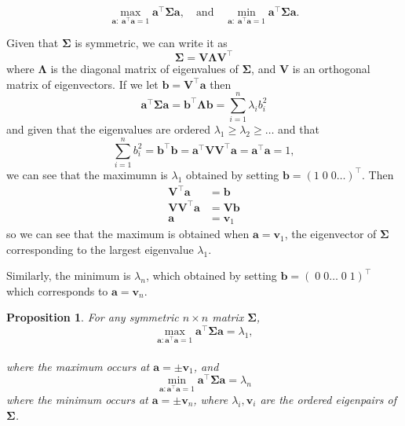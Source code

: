 \documentclass[]{book}
\newtheorem{proposition}{Proposition}[chapter]
\theoremstyle{definition}
\theoremstyle{definition}
\theoremstyle{definition}
\theoremstyle{remark}
\begin{document}
\begin{equation}
\max_{\boldsymbol a: \;\boldsymbol a^\top \boldsymbol a=1}{\mathbf a}^\top {\mathbf \Sigma} {\mathbf a}, \quad \mbox{and}\quad
\min_{\boldsymbol a: \;\boldsymbol a^\top \boldsymbol a=1}{\mathbf a}^\top {\mathbf \Sigma} {\mathbf a}.
\label{eq:eigenopt}
\end{equation}

Given that \(\boldsymbol \Sigma\) is symmetric, we can write it as
\[\boldsymbol \Sigma= \boldsymbol V\boldsymbol \Lambda\boldsymbol V^\top \]
where \(\boldsymbol \Lambda\) is the diagonal matrix of eigenvalues of \(\boldsymbol \Sigma\), and \(\boldsymbol V\) is an orthogonal matrix of eigenvectors. If we let \(\boldsymbol b=\boldsymbol V^\top \boldsymbol a\) then
\[\boldsymbol a^\top \boldsymbol \Sigma\boldsymbol a= \boldsymbol b^\top \boldsymbol \Lambda\boldsymbol b= \sum_{i=1}^n \lambda_i b_i^2\]
and given that the eigenvalues are ordered \(\lambda_1\geq \lambda_2 \geq \ldots\) and that \[\sum_{i=1}^n b_i^2=\boldsymbol b^\top\boldsymbol b=\boldsymbol a^\top \boldsymbol V\boldsymbol V^\top\boldsymbol a=\boldsymbol a^\top\boldsymbol a=1,\]
we can see that the maximumn is \(\lambda_1\) obtained by setting \(\boldsymbol b=(1\;0\;0 \ldots)^\top\). Then
\begin{align*}
\boldsymbol V^\top \boldsymbol a&= \boldsymbol b\\
\boldsymbol V\boldsymbol V^\top \boldsymbol a&=\boldsymbol V\boldsymbol b\\
\boldsymbol a&= \boldsymbol v_1
\end{align*}
so we can see that the maximum is obtained when \(\boldsymbol a=\boldsymbol v_1\), the eigenvector of \(\boldsymbol \Sigma\) corresponding to the largest eigenvalue \(\lambda_1\).

Similarly, the minimum is \(\lambda_n\), which obtained by setting \(\boldsymbol b=(\;0\;0 \ldots\;0\;1)^\top\) which corresponds to \(\boldsymbol a=\boldsymbol v_n\).

\begin{proposition}
\protect\hypertarget{prp:two8}{}{\label{prp:two8} }For any symmetric \(n \times n\) matrix \(\boldsymbol \Sigma\),
\[\max_{\boldsymbol a: \boldsymbol a^\top \boldsymbol a=1} \boldsymbol a^\top\boldsymbol \Sigma\boldsymbol a=\lambda_1,\]\\
where the maximum occurs at \(\boldsymbol a=\pm \boldsymbol v_1\), and
\[\min_{\boldsymbol a: \boldsymbol a^\top \boldsymbol a=1} \boldsymbol a^\top\boldsymbol \Sigma\boldsymbol a=\lambda_n\]
where the minimum occurs at \(\boldsymbol a= \pm \boldsymbol v_n\), where \(\lambda_i, \boldsymbol v_i\) are the ordered eigenpairs of \(\boldsymbol \Sigma\).
\end{proposition}
\end{document}
